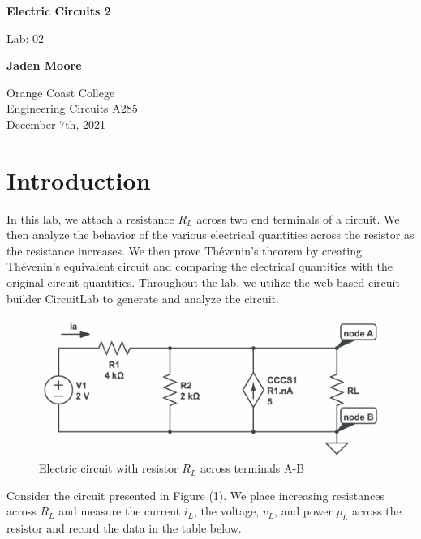 \documentclass[12pt]{article}
\begin{document}

\begin{titlepage}
    \begin{center}
        \vspace*{1cm}
        \textbf{Electric Circuits 2}

        \vspace{0.5cm}
        Lab: 02

        \vspace{1cm}

        \textbf{Jaden Moore}

        \vfill

        Orange Coast College\\
        Engineering Circuits A285\\
        December 7th, 2021

    \end{center}
\end{titlepage}

\pagestyle{fancy}
\fancyhf{}
\setlength{\headheight}{15pt}
\cfoot{\thepage}

\section{Introduction}
In this lab, we attach a resistance $R_L$ across two end terminals of a circuit. We then analyze the behavior of the various electrical quantities across the resistor as the resistance increases. We then prove Thévenin's theorem by creating Thévenin's equivalent circuit and comparing the electrical quantities with the original circuit quantities. Throughout the lab, we utilize the web based circuit builder CircuitLab to generate and analyze the circuit.

\begin{figure}[H]
    \begin{center}
        \includegraphics[scale=0.6]{circuit-1.png}
        \caption { Electric circuit with resistor $R_L$ across terminals A-B}
    \end{center}
\end{figure}
Consider the circuit presented in Figure (1). We place increasing resistances across $R_L$ and measure the current $i_L$, the voltage, $v_L$, and power $p_L$ across the resistor and record the data in the table below.
\end{document}
